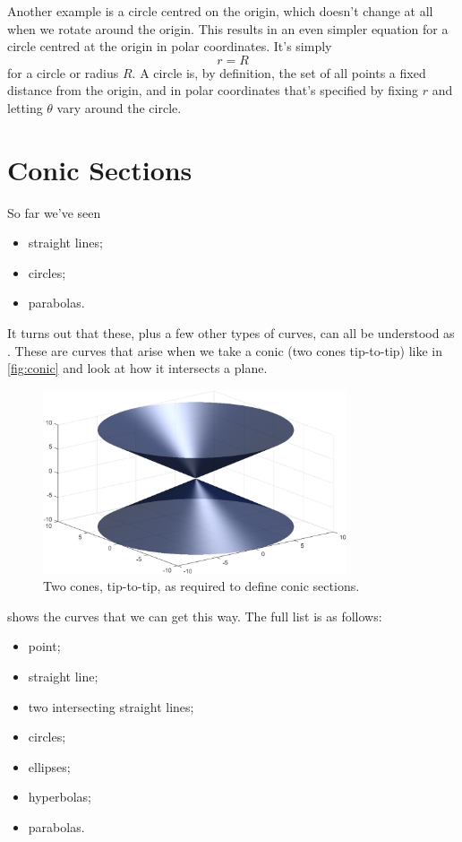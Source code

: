 \documentclass[fleqn]{LectureClass/LectureClass}
\begin{document}
    Another example is a circle centred on the origin, which doesn't change at all when we rotate around the origin.
    This results in an even simpler equation for a circle centred at the origin in polar coordinates.
    It's simply
    \begin{equation}
        r = R
    \end{equation}
    for a circle or radius \(R\).
    A circle is, by definition, the set of all points a fixed distance from the origin, and in polar coordinates that's specified by fixing \(r\) and letting \(\theta\) vary around the circle.
    
    \section{Conic Sections}
    So far we've seen
    \begin{itemize}
        \item straight lines;
        \item circles;
        \item parabolas.
    \end{itemize}
    It turns out that these, plus a few other types of curves, can all be understood as .
    These are curves that arise when we take a conic (two cones tip-to-tip) like in \cref{fig:conic} and look at how it intersects a plane.
    
    \begin{figure}
        \centering
        \includegraphics[width=0.8\textwidth]{images/conic-sections-cones}
        \caption[Cones]{Two cones, tip-to-tip, as required to define conic sections.}
    \end{figure}
    
     shows the curves that we can get this way.
    The full list is as follows:
    \begin{itemize}
        \item point;
        \item straight line;
        \item two intersecting straight lines;
        \item circles;
        \item ellipses;
        \item hyperbolas;
        \item parabolas.
    \end{itemize}
    
\end{document}

